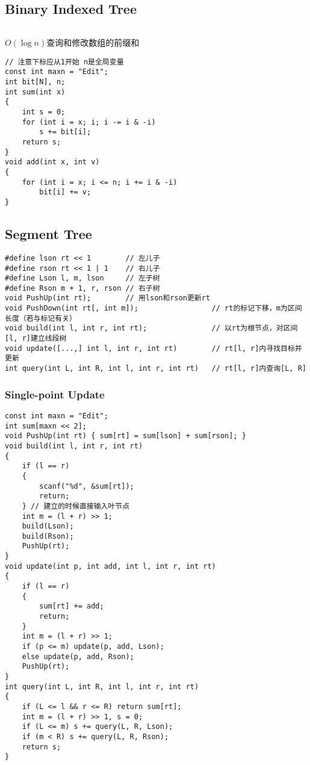 \documentclass[twoside]{article}
\begin{document}
\subsection{Binary Indexed Tree}
\begin{lstlisting}
\end{lstlisting}
$O(\log n)$查询和修改数组的前缀和
\begin{lstlisting}
// 注意下标应从1开始 n是全局变量
const int maxn = "Edit";
int bit[N], n;
int sum(int x)
{
    int s = 0;
    for (int i = x; i; i -= i & -i)
        s += bit[i];
    return s;
}
void add(int x, int v)
{
    for (int i = x; i <= n; i += i & -i)
        bit[i] += v;
}
\end{lstlisting}
\subsection{Segment Tree}
\begin{lstlisting}
#define lson rt << 1        // 左儿子
#define rson rt << 1 | 1    // 右儿子
#define Lson l, m, lson     // 左子树
#define Rson m + 1, r, rson // 右子树
void PushUp(int rt);        // 用lson和rson更新rt
void PushDown(int rt[, int m]);                 // rt的标记下移，m为区间长度（若与标记有关）
void build(int l, int r, int rt);               // 以rt为根节点，对区间[l, r]建立线段树
void update([...,] int l, int r, int rt)        // rt[l, r]内寻找目标并更新
int query(int L, int R, int l, int r, int rt)   // rt[l, r]内查询[L, R]
\end{lstlisting}
\subsubsection{Single-point Update}
\begin{lstlisting}
const int maxn = "Edit";
int sum[maxn << 2];
void PushUp(int rt) { sum[rt] = sum[lson] + sum[rson]; }
void build(int l, int r, int rt)
{
    if (l == r)
    {
        scanf("%d", &sum[rt]);
        return;
    } // 建立的时候直接输入叶节点
    int m = (l + r) >> 1;
    build(Lson);
    build(Rson);
    PushUp(rt);
}
void update(int p, int add, int l, int r, int rt)
{
    if (l == r)
    {
        sum[rt] += add;
        return;
    }
    int m = (l + r) >> 1;
    if (p <= m) update(p, add, Lson);
    else update(p, add, Rson);
    PushUp(rt);
}
int query(int L, int R, int l, int r, int rt)
{
    if (L <= l && r <= R) return sum[rt];
    int m = (l + r) >> 1, s = 0;
    if (L <= m) s += query(L, R, Lson);
    if (m < R) s += query(L, R, Rson);
    return s;
}
\end{lstlisting}
\end{document}
